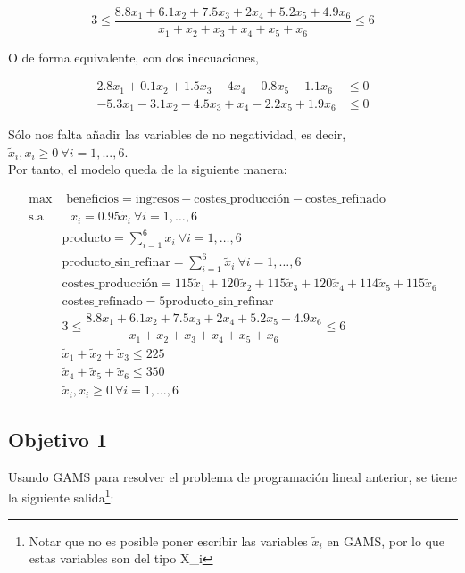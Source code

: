 \documentclass[12pt,a4paper,twoside,openright,titlepage,final]{article}
\begin{document}
\[ 3 \leq \dfrac{8.8x_1 + 6.1x_2 + 7.5x_3 + 2x_4 + 5.2x_5 + 4.9x_6}{x_1 + x_2 + x_3 + x_4 + x_5 + x_6} \leq 6 \]

O de forma equivalente, con dos inecuaciones, 

\begin{align*}
2.8x_1 + 0.1x_2 + 1.5x_3 - 4x_4 -0.8x_5 - 1.1x_6 & \leq 0 \\
-5.3x_1 - 3.1x_2 - 4.5x_3 + x_4 -2.2x_5 + 1.9x_6 & \leq 0
\end{align*}

Sólo nos falta añadir las variables de no negatividad, es decir, $\tilde{x}_i, x_i \geq 0 \ \forall i=1,...,6$.\\

Por tanto, el modelo queda de la siguiente manera:

\begin{align*}
\max & \text{ beneficios} = \text{ingresos} - \text{costes\_producción} - \text{costes\_refinado}\\
\text{s.a} & \text{\ } x_i = 0.95\tilde{x}_i \ \forall i = 1, \dots, 6 \\
& \text{producto} = \sum_{i=1}^{6} x_i \ \forall i = 1, \dots, 6 \\
&\text{producto\_sin\_refinar} = \sum_{i=1}^{6} \tilde{x}_i \ \forall i = 1, \dots, 6\\
&\text{costes\_producción} = 115\tilde{x}_1 + 120\tilde{x}_2 + 115\tilde{x}_3 + 120\tilde{x}_4 + 114\tilde{x}_5 + 115\tilde{x}_6 \\
&\text{costes\_refinado} = 5\text{producto\_sin\_refinar} \\
& 3 \leq \dfrac{8.8x_1 + 6.1x_2 + 7.5x_3 + 2x_4 + 5.2x_5 + 4.9x_6}{x_1 + x_2 + x_3 + x_4 + x_5 + x_6} \leq 6\\
&\tilde{x}_1 + \tilde{x}_2 + \tilde{x}_3 \leq 225\\
&\tilde{x}_4 + \tilde{x}_5 + \tilde{x}_6 \leq 350\\
&\tilde{x}_i, x_i \geq 0 \ \forall i=1,...,6
\end{align*}

\subsection{Objetivo 1}

Usando GAMS para resolver el problema de programación lineal anterior, se tiene la siguiente salida\footnote{Notar que no es posible poner escribir las variables $\tilde{x}_i$ en GAMS, por lo que estas variables son del tipo X\_i}:
\end{document}

